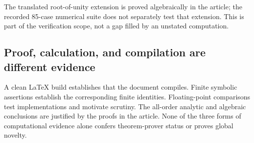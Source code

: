 The translated root-of-unity extension is proved algebraically in the
article; the recorded 85-case numerical suite does not separately test
that extension. This is part of the verification scope, not a gap
filled by an unstated computation.

\subsection{Proof, calculation, and compilation are different evidence}
A clean LaTeX build establishes that the document compiles. Finite
symbolic assertions establish the corresponding finite identities.
Floating-point comparisons test implementations and motivate scrutiny.
The all-order analytic and algebraic conclusions are justified by the
proofs in the article. None of the three forms of computational evidence
alone confers theorem-prover status or proves global novelty.
